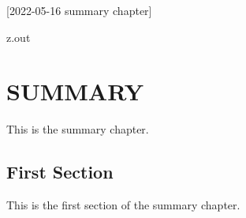 [2022-05-16 summary chapter]

\begin{VerbatimOut}{z.out}
\chapter{SUMMARY}

This is the summary chapter.


\section{First Section}

This is the first section of the summary chapter.
\end{VerbatimOut}

\MyIO
